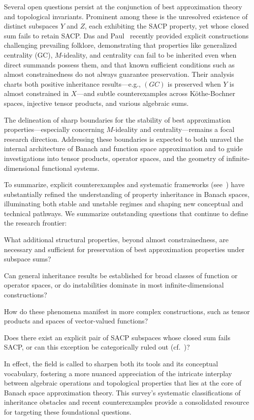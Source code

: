 \documentclass[sigconf]{acmart}
\begin{document}
Several open questions persist at the conjunction of best approximation theory and topological invariants. Prominent among these is the unresolved existence of distinct subspaces $Y$ and $Z$, each exhibiting the SACP property, yet whose closed sum fails to retain SACP. Das and Paul~\cite{ref103} recently provided explicit constructions challenging prevailing folklore, demonstrating that properties like generalized centrality (GC), $M$-ideality, and centrality can fail to be inherited even when direct summands possess them, and that known sufficient conditions such as almost constrainedness do not always guarantee preservation. Their analysis charts both positive inheritance results---e.g., $(GC)$ is preserved when $Y$ is almost constrained in $X$---and subtle counterexamples across K\"othe-Bochner spaces, injective tensor products, and various algebraic sums.

The delineation of sharp boundaries for the stability of best approximation properties—especially concerning $M$-ideality and centrality—remains a focal research direction. Addressing these boundaries is expected to both unravel the internal architecture of Banach and function space approximation and to guide investigations into tensor products, operator spaces, and the geometry of infinite-dimensional functional systems.

To summarize, explicit counterexamples and systematic frameworks (see~\cite{ref103}) have substantially refined the understanding of property inheritance in Banach spaces, illuminating both stable and unstable regimes and shaping new conceptual and technical pathways. We summarize outstanding questions that continue to define the research frontier:

What additional structural properties, beyond almost constrainedness, are necessary and sufficient for preservation of best approximation properties under subspace sums?

Can general inheritance results be established for broad classes of function or operator spaces, or do instabilities dominate in most infinite-dimensional constructions?

How do these phenomena manifest in more complex constructions, such as tensor products and spaces of vector-valued functions?

Does there exist an explicit pair of SACP subspaces whose closed sum fails SACP, or can this exception be categorically ruled out (cf.~\cite{ref103})?

In effect, the field is called to sharpen both its tools and its conceptual vocabulary, fostering a more nuanced appreciation of the intricate interplay between algebraic operations and topological properties that lies at the core of Banach space approximation theory. This survey's systematic classifications of inheritance obstacles and recent counterexamples provide a consolidated resource for targeting these foundational questions.
\end{document}
